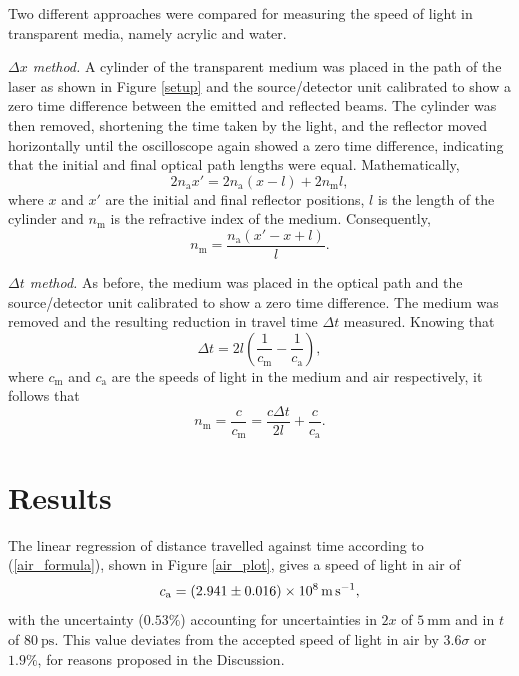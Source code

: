 \documentclass[
    aps,
    prl,
    reprint,
    10pt,
    amsmath,
    amssymb,
    a4paper,
    longbibliography
]{revtex4-2}
\begin{document}
Two different approaches were compared for measuring the speed of
light in transparent media, namely acrylic and water.

\emph{$\Delta x$ method.} A cylinder of the transparent medium was placed
in the path of the laser as shown in Figure \ref{setup} and the
source/detector unit calibrated to show a zero time difference between
the emitted and reflected beams. The cylinder was then removed,
shortening the time taken by the light, and the reflector moved horizontally
until the oscilloscope again showed a zero time difference, indicating
that the initial and final optical path lengths were equal. Mathematically,
\[
    2 n_\mathrm{a} x' = 2 n_\mathrm{a} (x - l) + 2 n_\mathrm{m} l,
\]
where $x$ and $x'$ are the initial and final reflector positions, $l$ is
the length of the cylinder and $n_\mathrm{m}$ is the refractive index of the
medium. Consequently,
\[
    n_\mathrm{m} = \frac{n_\mathrm{a} (x' - x + l)}{l}.
\]

\emph{$\Delta t$ method.} As before, the medium was placed in the optical
path and the source/detector unit calibrated to show a zero time
difference. The medium was removed and the resulting reduction in
travel time $\Delta t$ measured. Knowing that
\[
    \Delta t = 2 l \left(
        \frac{1}{c_\mathrm{m}} - \frac{1}{c_\mathrm{a}}
    \right),
\]
where $c_\mathrm{m}$ and $c_\mathrm{a}$ are the speeds of light in the
medium and air respectively, it follows that
\[
    n_\mathrm{m} = \frac{c}{c_\mathrm{m}}
    = \frac{c \Delta t}{2 l} + \frac{c}{c_\mathrm{a}}.
\]

\section{Results}

The linear regression of distance travelled against time according
to (\ref{air_formula}), shown in Figure \ref{air_plot}, gives a speed of
light in air of
\[
    c_\mathrm{a} = \SI{2.941 \pm 0.016e8}{\meter \per\second},
\]
with the uncertainty ($0.53\%$) accounting for uncertainties in $2x$
of $\SI{5}{\milli\meter}$ and in $t$ of $\SI{80}{\pico\second}$.
This value deviates from the accepted speed of light in air by
$3.6 \sigma$ or $1.9\%$, for reasons proposed in the Discussion.
\end{document}
